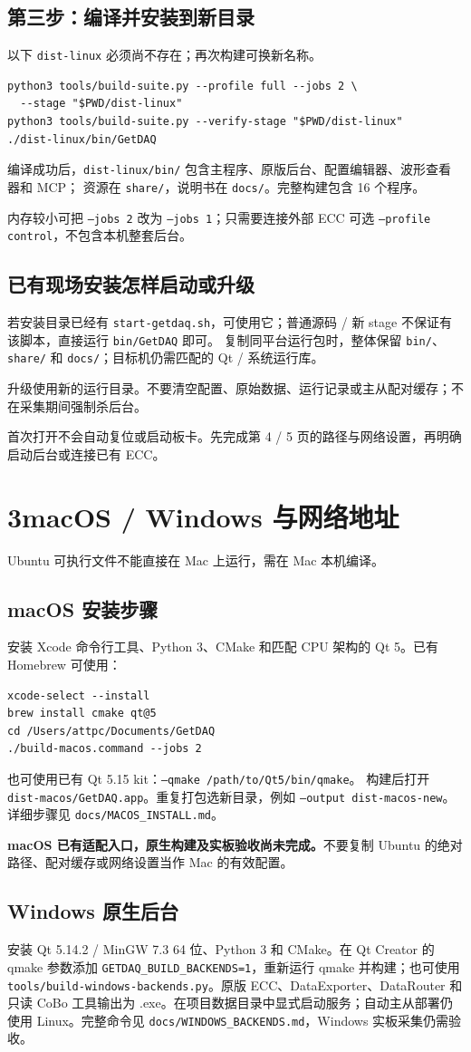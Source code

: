 \documentclass[11pt,a4paper]{article}
\newcommand{\code}[1]{\texttt{#1}}
\newcommand{\note}[1]{\begin{tcolorbox}[colback=light,colframe=accent!40,boxrule=0.5pt,arc=2mm,left=8pt,right=8pt,top=5pt,bottom=5pt]#1\end{tcolorbox}}
\newcommand{\pagehead}[2]{\pdfbookmark[1]{#1}{getdaq-guide-\thepage}\section*{#1}\textcolor{muted}{#2}\par\vspace{3pt}}
\begin{document}
\subsection*{第三步：编译并安装到新目录}
以下 \code{dist-linux} 必须尚不存在；再次构建可换新名称。
\begin{verbatim}
python3 tools/build-suite.py --profile full --jobs 2 \
  --stage "$PWD/dist-linux"
python3 tools/build-suite.py --verify-stage "$PWD/dist-linux"
./dist-linux/bin/GetDAQ
\end{verbatim}
编译成功后，\code{dist-linux/bin/} 包含主程序、原版后台、配置编辑器、波形查看器和 MCP；
资源在 \code{share/}，说明书在 \code{docs/}。完整构建包含 16 个程序。\par
内存较小可把 \code{--jobs 2} 改为 \code{--jobs 1}；只需要连接外部 ECC 可选 \code{--profile control}，不包含本机整套后台。
\subsection*{已有现场安装怎样启动或升级}
若安装目录已经有 \code{start-getdaq.sh}，可使用它；普通源码 / 新 stage 不保证有该脚本，直接运行 \code{bin/GetDAQ} 即可。
复制同平台运行包时，整体保留 \code{bin/}、\code{share/} 和 \code{docs/}；目标机仍需匹配的 Qt / 系统运行库。\par
升级使用新的运行目录。不要清空配置、原始数据、运行记录或主从配对缓存；不在采集期间强制杀后台。
\note{首次打开不会自动复位或启动板卡。先完成第 4 / 5 页的路径与网络设置，再明确启动后台或连接已有 ECC。}

\newpage
\pagehead{3\quad macOS / Windows 与网络地址}{Ubuntu 可执行文件不能直接在 Mac 上运行，需在 Mac 本机编译。}
\subsection*{macOS 安装步骤}
安装 Xcode 命令行工具、Python 3、CMake 和匹配 CPU 架构的 Qt 5。已有 Homebrew 可使用：
\begin{verbatim}
xcode-select --install
brew install cmake qt@5
cd /Users/attpc/Documents/GetDAQ
./build-macos.command --jobs 2
\end{verbatim}
也可使用已有 Qt 5.15 kit：\code{--qmake /path/to/Qt5/bin/qmake}。
构建后打开 \code{dist-macos/GetDAQ.app}。重复打包选新目录，例如
\code{--output dist-macos-new}。详细步骤见 \code{docs/MACOS\_INSTALL.md}。\par
\textbf{macOS 已有适配入口，原生构建及实板验收尚未完成。}不要复制 Ubuntu 的绝对路径、配对缓存或网络设置当作 Mac 的有效配置。
\subsection*{Windows 原生后台}
安装 Qt 5.14.2 / MinGW 7.3 64 位、Python 3 和 CMake。在 Qt Creator 的 qmake 参数添加 \code{GETDAQ\_BUILD\_BACKENDS=1}，重新运行 qmake 并构建；也可使用 \code{tools/build-windows-backends.py}。原版 ECC、DataExporter、DataRouter 和只读 CoBo 工具输出为 .exe。在项目数据目录中显式启动服务；自动主从部署仍使用 Linux。完整命令见 \code{docs/WINDOWS\_BACKENDS.md}，Windows 实板采集仍需验收。
\end{document}
